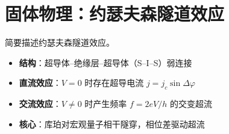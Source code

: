 \section{固体物理：约瑟夫森隧道效应}
\label{sec:josephson-effect}

\begin{modelbox}[题目：约瑟夫森结的直流与交流效应]
简要描述约瑟夫森隧道效应。
\end{modelbox}

\begin{tipbox}[考点快速分析]
\begin{itemize}
    \item \textbf{结构}：超导体--绝缘层--超导体（S--I--S）弱连接
    \item \textbf{直流效应}：$V=0$ 时存在超导电流 $j=j_c\sin\Delta\varphi$
    \item \textbf{交流效应}：$V\neq0$ 时产生频率 $f=2eV/h$ 的交变超流
    \item \textbf{核心}：库珀对宏观量子相干隧穿，相位差驱动超流
\end{itemize}
\end{tipbox}


